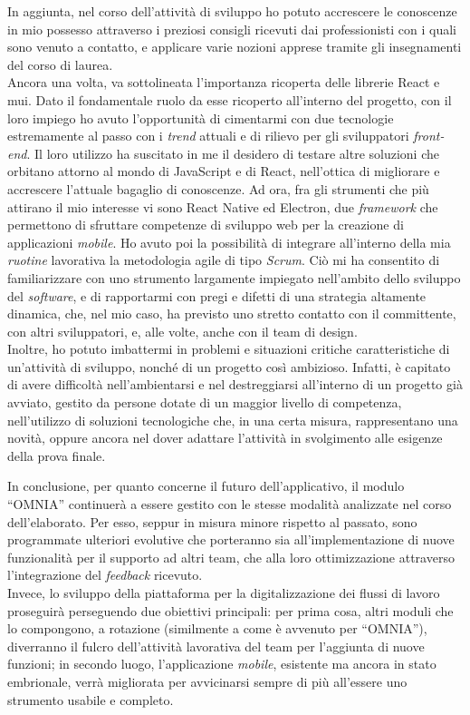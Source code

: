 In aggiunta, nel corso dell'attività di sviluppo ho potuto accrescere le conoscenze in mio possesso attraverso i preziosi consigli ricevuti dai professionisti con i quali sono venuto a contatto, e applicare varie nozioni apprese tramite gli insegnamenti del corso di laurea.\\
Ancora una volta, va sottolineata l'importanza ricoperta delle librerie React e \acrlong*{mui}. Dato il fondamentale ruolo da esse ricoperto all'interno del progetto, con il loro impiego ho avuto l'opportunità di cimentarmi con due tecnologie estremamente al passo con i \textit{trend} attuali e di rilievo per gli sviluppatori \textit{front-end}. Il loro utilizzo ha suscitato in me il desidero di testare altre soluzioni che orbitano attorno al mondo di JavaScript e di React, nell'ottica di migliorare e accrescere l'attuale bagaglio di conoscenze. Ad ora, fra gli strumenti che più attirano il mio interesse vi sono React Native ed Electron, due \textit{framework} che permettono di sfruttare competenze di sviluppo web per la creazione di applicazioni \textit{mobile}. Ho avuto poi la possibilità di integrare all'interno della mia \textit{ruotine} lavorativa la metodologia agile di tipo \textit{Scrum}. Ciò mi ha consentito di familiarizzare con uno strumento largamente impiegato nell'ambito dello sviluppo del \textit{software}, e di rapportarmi con pregi e difetti di una strategia altamente dinamica, che, nel mio caso, ha previsto uno stretto contatto con il committente, con altri sviluppatori, e, alle volte, anche con il team di design.\\
Inoltre, ho potuto imbattermi in problemi e situazioni critiche caratteristiche di un'attività di sviluppo, nonché di un progetto così ambizioso. Infatti, è capitato di avere difficoltà nell'ambientarsi e nel destreggiarsi all'interno di un progetto già avviato, gestito da persone dotate di un maggior livello di competenza, nell'utilizzo di soluzioni tecnologiche che, in una certa misura, rappresentano una novità, oppure ancora nel dover adattare l'attività in svolgimento alle esigenze della prova finale. 

In conclusione, per quanto concerne il futuro dell'applicativo, il modulo “OMNIA” continuerà a essere gestito con le stesse modalità analizzate nel corso dell'elaborato. Per esso, seppur in misura minore rispetto al passato, sono programmate ulteriori evolutive che porteranno sia all'implementazione di nuove funzionalità per il supporto ad altri team, che alla loro ottimizzazione attraverso l'integrazione del \textit{feedback} ricevuto.\\
Invece, lo sviluppo della piattaforma per la digitalizzazione dei flussi di lavoro proseguirà perseguendo due obiettivi principali: per prima cosa, altri moduli che lo compongono, a rotazione (similmente a come è avvenuto per “OMNIA”), diverranno il fulcro dell'attività lavorativa del team per l'aggiunta di nuove funzioni; in secondo luogo, l'applicazione \textit{mobile}, esistente ma ancora in stato embrionale, verrà migliorata per avvicinarsi sempre di più all'essere uno strumento usabile e completo.